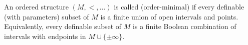 An ordered structure $(M, <, \ldots)$ is called  (order-minimal) if every definable (with parameters) subset of $M$ is a finite union of open intervals and points. Equivalently, every definable subset of $M$ is a finite Boolean combination of intervals with endpoints in $M \cup \{\pm \infty\}$.

